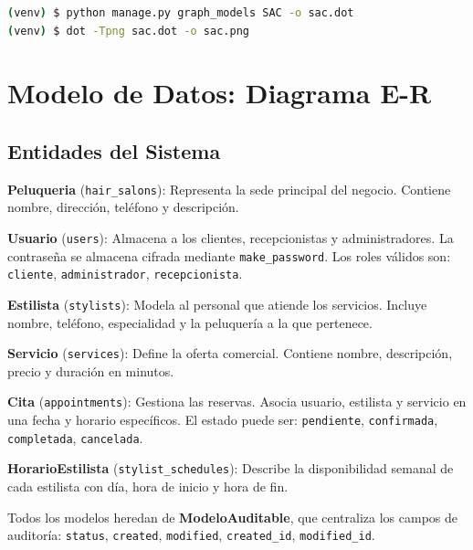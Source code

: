 \documentclass[12pt,a4paper]{article}
\begin{document}
\begin{lstlisting}[language=bash, caption=Generando diagrama E-R]
(venv) $ python manage.py graph_models SAC -o sac.dot
(venv) $ dot -Tpng sac.dot -o sac.png
\end{lstlisting}

\section{Modelo de Datos: Diagrama E-R}


\subsection{Entidades del Sistema}

\textbf{Peluqueria} (\texttt{hair\_salons}): Representa la sede principal del negocio.
Contiene nombre, dirección, teléfono y descripción.

\textbf{Usuario} (\texttt{users}): Almacena a los clientes, recepcionistas y administradores.
La contraseña se almacena cifrada mediante \texttt{make\_password}.
Los roles válidos son: \texttt{cliente}, \texttt{administrador}, \texttt{recepcionista}.

\textbf{Estilista} (\texttt{stylists}): Modela al personal que atiende los servicios.
Incluye nombre, teléfono, especialidad y la peluquería a la que pertenece.

\textbf{Servicio} (\texttt{services}): Define la oferta comercial.
Contiene nombre, descripción, precio y duración en minutos.

\textbf{Cita} (\texttt{appointments}): Gestiona las reservas.
Asocia usuario, estilista y servicio en una fecha y horario específicos.
El estado puede ser: \texttt{pendiente}, \texttt{confirmada}, \texttt{completada}, \texttt{cancelada}.

\textbf{HorarioEstilista} (\texttt{stylist\_schedules}): Describe la disponibilidad semanal
de cada estilista con día, hora de inicio y hora de fin.

Todos los modelos heredan de \textbf{ModeloAuditable}, que centraliza los campos de auditoría:
\texttt{status}, \texttt{created}, \texttt{modified}, \texttt{created\_id}, \texttt{modified\_id}.
\end{document}
